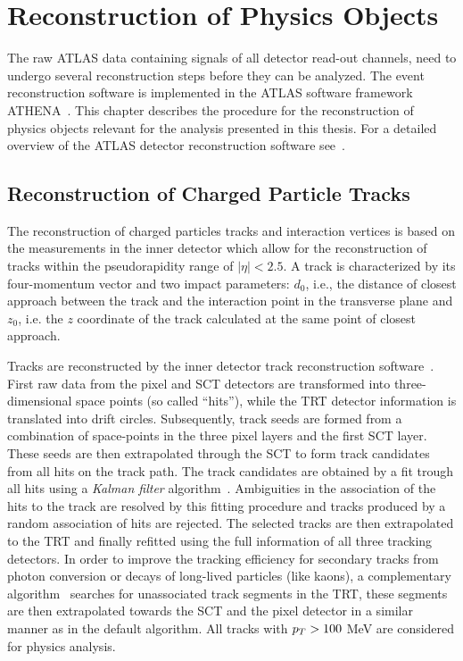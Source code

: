 \chapter{Reconstruction of Physics Objects}\label{chap:obj} \vspace{2cm}

The raw ATLAS  data containing  signals of all detector read-out channels, need to
undergo  several reconstruction steps before they can be analyzed. The event reconstruction software is 
implemented in the ATLAS  software framework ATHENA~\cite{Athena}.
This chapter describes the procedure for the  reconstruction  of physics objects relevant for the
analysis presented in this thesis.
For a detailed overview of the ATLAS detector reconstruction software  see~\cite{AtlasCSCBook}. 

\restoregeometry
\clearpage

\section{Reconstruction of Charged Particle Tracks}
The reconstruction of charged particles tracks and interaction vertices is based on the measurements in the inner detector
which allow  for the reconstruction of tracks within the pseudorapidity range of $|\eta| < 2.5$. 
A track is characterized by its four-momentum vector and two impact parameters: $d_0$, i.e.,  the distance 
of closest approach between the track and the interaction point in the transverse plane and $z_0$, i.e.
the $z$ coordinate of the track calculated at the same point of closest approach. 


Tracks are reconstructed  by the inner detector track reconstruction software~\cite{IDtracking}.
First raw data from the pixel and SCT detectors are transformed into three-dimensional space points 
(so called ``hits''), while the  TRT detector information is translated into drift circles. 
Subsequently, track seeds are formed from a combination of space-points in the three pixel layers and the first SCT layer. These
seeds are then extrapolated through the SCT to form track candidates  from all hits on the track path. The track candidates are obtained by a 
fit trough all hits using a \emph{Kalman filter} algorithm~\cite{Kalman}. Ambiguities in the  association of the hits to the track 
are resolved by this fitting procedure and  tracks produced by a random association of hits are rejected. The selected tracks are then 
extrapolated to the TRT and finally refitted using the full information of all three tracking detectors. 
In order to  improve the tracking efficiency for secondary tracks  from photon conversion or decays 
of long-lived particles (like kaons), a complementary algorithm~\cite{IDtracking} searches 
for unassociated track segments in the TRT, these segments are then extrapolated towards the SCT and the pixel detector in
a similar manner as in the default algorithm. All tracks with $p_{T} > 100$ MeV are considered for physics
analysis.


